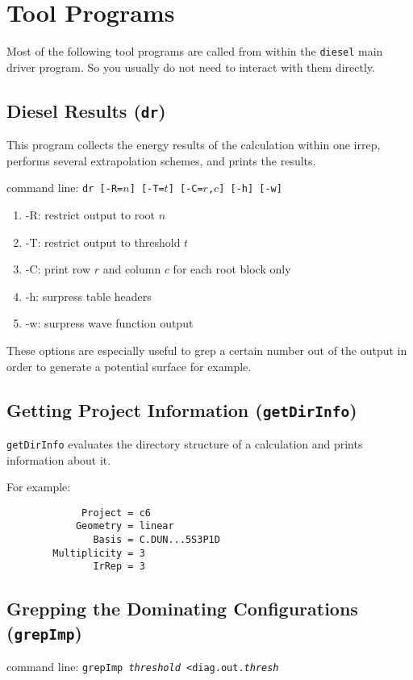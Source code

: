 \section{Tool Programs}
Most of the following tool programs are called from within the 
{\tt diesel} main driver program. So you usually do not need to interact
with them directly. 

\subsection{Diesel Results ({\tt dr})}
This program collects the energy results of the calculation within one irrep,
performs several extrapolation schemes, and prints the results.

\bigskip
command line:
{\tt dr [-R=$n$] [-T=$t$] [-C=$r$,$c$] [-h] [-w]}

\begin{enumerate}
\item -R: restrict output to root $n$
\item -T: restrict output to threshold $t$
\item -C: print row $r$ and column $c$ for each root block only
\item -h: surpress table headers
\item -w: surpress wave function output
\end{enumerate}

These options are especially useful to grep a certain number out of
the output in order to generate a potential surface for example.


\subsection{Getting Project Information ({\tt getDirInfo})}
{\tt getDirInfo} evaluates the directory structure of a calculation
and prints information about it.

For example:
\begin{verbatim}
             Project = c6
            Geometry = linear
               Basis = C.DUN...5S3P1D
        Multiplicity = 3
               IrRep = 3
\end{verbatim}


\subsection{Grepping the Dominating Configurations ({\tt grepImp})}
\bigskip

command line:
{\tt grepImp {\it threshold} <diag.out.{\it thresh}}

